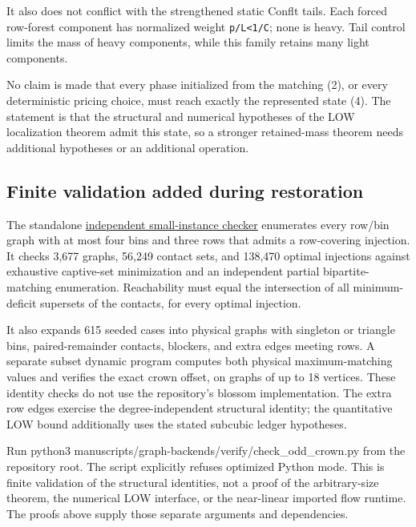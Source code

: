 It also does not conflict with the strengthened static Conflt tails. Each forced row-forest component has normalized weight \texttt{p/L\textless{}1/C}; none is heavy. Tail control limits the mass of heavy components, while this family retains many light components.

No claim is made that every phase initialized from the matching (2), or every deterministic pricing choice, must reach exactly the represented state (4). The statement is that the structural and numerical hypotheses of the LOW localization theorem admit this state, so a stronger retained-mass theorem needs additional hypotheses or an additional operation.

\hypertarget{af-f687f276ee-finite-validation-added-during-restoration}{%
\subsection{Finite validation added during restoration}\label{af-f687f276ee-finite-validation-added-during-restoration}}

The standalone \href{https://github.com/icekylinx/algorithm-frontier/blob/main/manuscripts/graph-backends/verify/check_odd_crown.py}{independent small-instance checker} enumerates every row/bin graph with at most four bins and three rows that admits a row-covering injection. It checks 3,677 graphs, 56,249 contact sets, and 138,470 optimal injections against exhaustive captive-set minimization and an independent partial bipartite-matching enumeration. Reachability must equal the intersection of all minimum-deficit supersets of the contacts, for every optimal injection.

It also expands 615 seeded cases into physical graphs with singleton or triangle bins, paired-remainder contacts, blockers, and extra edges meeting rows. A separate subset dynamic program computes both physical maximum-matching values and verifies the exact crown offset, on graphs of up to 18 vertices. These identity checks do not use the repository's blossom implementation. The extra row edges exercise the degree-independent structural identity; the quantitative LOW bound additionally uses the stated subcubic ledger hypotheses.

Run python3 manuscripts/graph-backends/verify/check\_odd\_crown.py from the repository root. The script explicitly refuses optimized Python mode. This is finite validation of the structural identities, not a proof of the arbitrary-size theorem, the numerical LOW interface, or the near-linear imported flow runtime. The proofs above supply those separate arguments and dependencies.

